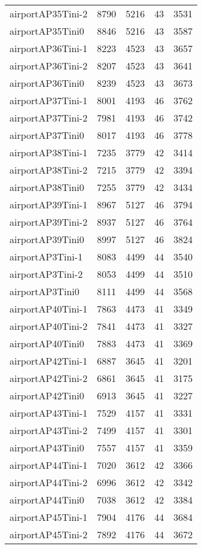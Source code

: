 \begin{longtable}{lrrrr}
airportAP35Tini-2 & 8790 & 5216 & 43 & 3531 \\
airportAP35Tini0 & 8846 & 5216 & 43 & 3587 \\
airportAP36Tini-1 & 8223 & 4523 & 43 & 3657 \\
airportAP36Tini-2 & 8207 & 4523 & 43 & 3641 \\
airportAP36Tini0 & 8239 & 4523 & 43 & 3673 \\
airportAP37Tini-1 & 8001 & 4193 & 46 & 3762 \\
airportAP37Tini-2 & 7981 & 4193 & 46 & 3742 \\
airportAP37Tini0 & 8017 & 4193 & 46 & 3778 \\
airportAP38Tini-1 & 7235 & 3779 & 42 & 3414 \\
airportAP38Tini-2 & 7215 & 3779 & 42 & 3394 \\
airportAP38Tini0 & 7255 & 3779 & 42 & 3434 \\
airportAP39Tini-1 & 8967 & 5127 & 46 & 3794 \\
airportAP39Tini-2 & 8937 & 5127 & 46 & 3764 \\
airportAP39Tini0 & 8997 & 5127 & 46 & 3824 \\
airportAP3Tini-1 & 8083 & 4499 & 44 & 3540 \\
airportAP3Tini-2 & 8053 & 4499 & 44 & 3510 \\
airportAP3Tini0 & 8111 & 4499 & 44 & 3568 \\
airportAP40Tini-1 & 7863 & 4473 & 41 & 3349 \\
airportAP40Tini-2 & 7841 & 4473 & 41 & 3327 \\
airportAP40Tini0 & 7883 & 4473 & 41 & 3369 \\
airportAP42Tini-1 & 6887 & 3645 & 41 & 3201 \\
airportAP42Tini-2 & 6861 & 3645 & 41 & 3175 \\
airportAP42Tini0 & 6913 & 3645 & 41 & 3227 \\
airportAP43Tini-1 & 7529 & 4157 & 41 & 3331 \\
airportAP43Tini-2 & 7499 & 4157 & 41 & 3301 \\
airportAP43Tini0 & 7557 & 4157 & 41 & 3359 \\
airportAP44Tini-1 & 7020 & 3612 & 42 & 3366 \\
airportAP44Tini-2 & 6996 & 3612 & 42 & 3342 \\
airportAP44Tini0 & 7038 & 3612 & 42 & 3384 \\
airportAP45Tini-1 & 7904 & 4176 & 44 & 3684 \\
airportAP45Tini-2 & 7892 & 4176 & 44 & 3672 \\

\end{longtable}
